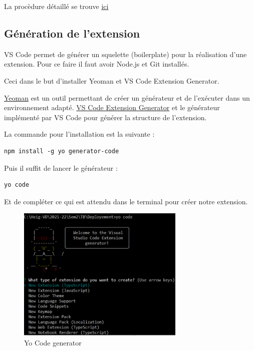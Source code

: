 \documentclass[
    iict, %
    il, %
]{heig-tb}
\begin{document}
La procèdure détaillé se trouve \href{https://code.visualstudio.com/api/get-started/your-first-extension
}{ici}

\subsection{Génération de l'extension}

VS Code permet de générer un squelette (boilerplate) pour la réalisation d'une extension.
Pour ce faire il faut avoir Node.js et Git installés.

Ceci dans le but d'installer Yeoman et VS Code Extension Generator.

\href{https://yeoman.io/}{Yeoman} est un outil permettant de créer un générateur et de l'exécuter dans un environnement adapté.
\href{https://www.npmjs.com/package/generator-code}{VS Code Extension Generator} et le générateur implémenté par VS Code pour générer la structure de l'extension.

La commande pour l'installation est la suivante :

\begin{lstlisting}[frame=single,caption={generator-code},label={generator-code}]
npm install -g yo generator-code
\end{lstlisting}

Puis il suffit de lancer le générateur :

\begin{lstlisting}[frame=single]
yo code
\end{lstlisting}

Et de compléter ce qui est attendu dans le terminal pour créer notre extension.

\begin{figure}[!h]
    \begin{center}
        \includegraphics[width=8cm]{assets/figures/yo-code.png}
    \end{center}
    \caption[Yo Code generator]{\label{yo-code}Yo Code generator}
\end{figure}
\end{document}
